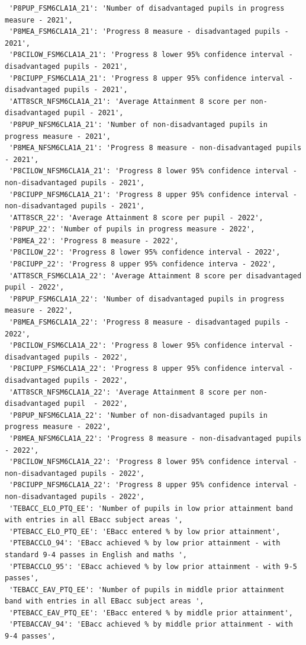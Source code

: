 \documentclass[
  letterpaper,
  DIV=11,
  numbers=noendperiod]{scrartcl}
\begin{document}
\begin{verbatim}
 'P8PUP_FSM6CLA1A_21': 'Number of disadvantaged pupils in progress measure - 2021',
 'P8MEA_FSM6CLA1A_21': 'Progress 8 measure - disadvantaged pupils - 2021',
 'P8CILOW_FSM6CLA1A_21': 'Progress 8 lower 95% confidence interval - disadvantaged pupils - 2021',
 'P8CIUPP_FSM6CLA1A_21': 'Progress 8 upper 95% confidence interval - disadvantaged pupils - 2021',
 'ATT8SCR_NFSM6CLA1A_21': 'Average Attainment 8 score per non-disadvantaged pupil - 2021',
 'P8PUP_NFSM6CLA1A_21': 'Number of non-disadvantaged pupils in progress measure - 2021',
 'P8MEA_NFSM6CLA1A_21': 'Progress 8 measure - non-disadvantaged pupils - 2021',
 'P8CILOW_NFSM6CLA1A_21': 'Progress 8 lower 95% confidence interval - non-disadvantaged pupils - 2021',
 'P8CIUPP_NFSM6CLA1A_21': 'Progress 8 upper 95% confidence interval - non-disadvantaged pupils - 2021',
 'ATT8SCR_22': 'Average Attainment 8 score per pupil - 2022',
 'P8PUP_22': 'Number of pupils in progress measure - 2022',
 'P8MEA_22': 'Progress 8 measure - 2022',
 'P8CILOW_22': 'Progress 8 lower 95% confidence interval - 2022',
 'P8CIUPP_22': 'Progress 8 upper 95% confidence interva - 2022',
 'ATT8SCR_FSM6CLA1A_22': 'Average Attainment 8 score per disadvantaged pupil - 2022',
 'P8PUP_FSM6CLA1A_22': 'Number of disadvantaged pupils in progress measure - 2022',
 'P8MEA_FSM6CLA1A_22': 'Progress 8 measure - disadvantaged pupils - 2022',
 'P8CILOW_FSM6CLA1A_22': 'Progress 8 lower 95% confidence interval - disadvantaged pupils - 2022',
 'P8CIUPP_FSM6CLA1A_22': 'Progress 8 upper 95% confidence interval - disadvantaged pupils - 2022',
 'ATT8SCR_NFSM6CLA1A_22': 'Average Attainment 8 score per non-disadvantaged pupil  - 2022',
 'P8PUP_NFSM6CLA1A_22': 'Number of non-disadvantaged pupils in progress measure - 2022',
 'P8MEA_NFSM6CLA1A_22': 'Progress 8 measure - non-disadvantaged pupils - 2022',
 'P8CILOW_NFSM6CLA1A_22': 'Progress 8 lower 95% confidence interval - non-disadvantaged pupils - 2022',
 'P8CIUPP_NFSM6CLA1A_22': 'Progress 8 upper 95% confidence interval - non-disadvantaged pupils - 2022',
 'TEBACC_ELO_PTQ_EE': 'Number of pupils in low prior attainment band with entries in all EBacc subject areas ',
 'PTEBACC_ELO_PTQ_EE': 'EBacc entered % by low prior attainment',
 'PTEBACCLO_94': 'EBacc achieved % by low prior attainment - with standard 9-4 passes in English and maths ',
 'PTEBACCLO_95': 'EBacc achieved % by low prior attainment - with 9-5 passes',
 'TEBACC_EAV_PTQ_EE': 'Number of pupils in middle prior attainment band with entries in all EBacc subject areas ',
 'PTEBACC_EAV_PTQ_EE': 'EBacc entered % by middle prior attainment',
 'PTEBACCAV_94': 'EBacc achieved % by middle prior attainment - with 9-4 passes',

\end{verbatim}
\end{document}
